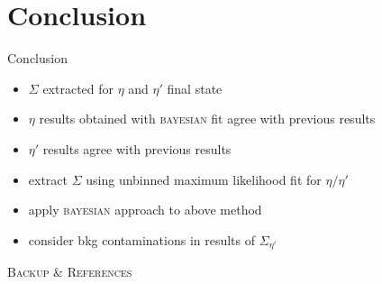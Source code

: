 \documentclass[11pt,aspectratio=169,dvipsnames]{beamer}
\newcommand{\thecolor}{black!70!blue}
\begin{document}
\section{Conclusion}
\begin{frame}{Conclusion}
	\begin{minipage}{.49\linewidth}
		\begin{tcolorbox}[colback=blue!5,colframe=\thecolor,title={Summary}]
			\begin{itemize}
				\item $\Sigma$ extracted for $\eta$ and $\eta'$ final state
				\item $\eta$ results obtained with \textsc{bayesian} fit agree with previous results 
				\item $\eta'$ results agree with previous results
			\end{itemize}
			\end{tcolorbox}
	\end{minipage}
\begin{minipage}{.49\linewidth}
	\begin{tcolorbox}[colback=blue!5,colframe=\thecolor,title={Outlook}]
		\begin{itemize}
			
			\item extract $\Sigma$ using unbinned maximum likelihood fit for $\eta/\eta'$
			\item apply \textsc{bayesian} approach to above method
			\item consider bkg contaminations in results of $\Sigma_{\eta'}$
			
		\end{itemize}
	\end{tcolorbox}
\end{minipage}
\end{frame}

\appendix
\begin{frame}
	\centering
	\LARGE
	\color{\thecolor}\textsc{Backup \& References}
\end{frame}
\end{document}
